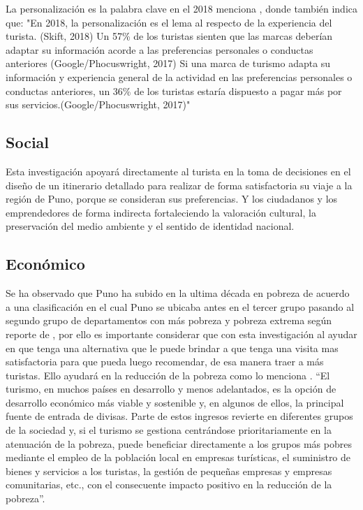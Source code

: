 La personalización es la palabra clave en el 2018 menciona  , donde también indica que:
"En 2018, la personalización es el lema al respecto de la experiencia del turista. (Skift, 2018)
Un 57\% de los turistas sienten que las marcas deberían adaptar su información acorde a las preferencias personales o conductas anteriores (Google/Phocuswright, 2017)
Si una marca de turismo adapta su información y experiencia general de la actividad en las preferencias personales o conductas anteriores, un 36\% de los turistas estaría dispuesto a pagar más por sus servicios.(Google/Phocuswright, 2017)"
\subsection{Social}
Esta investigación apoyará directamente al turista en la toma de decisiones en el diseño de un itinerario detallado para realizar de forma satisfactoria su viaje a la región de Puno, porque se consideran sus preferencias. Y los ciudadanos y los emprendedores de forma indirecta fortaleciendo la valoración cultural, la preservación del medio ambiente y el sentido de identidad nacional. 
\subsection{Económico}

Se ha observado que Puno ha subido en la ultima década en pobreza de acuerdo a una clasificación en el cual Puno se ubicaba antes en el tercer grupo pasando al segundo grupo de departamentos con más pobreza y pobreza extrema según reporte de , por ello es importante considerar que con esta investigación al ayudar en que tenga una alternativa que le puede brindar a que tenga una visita mas satisfactoria para que pueda luego recomendar, de esa manera traer a más turistas. Ello ayudará en la reducción de la pobreza como lo menciona . “El turismo, en muchos países en desarrollo y menos adelantados, es la opción de desarrollo económico más viable y sostenible y, en algunos de ellos, la principal fuente de entrada de divisas. Parte de estos ingresos revierte en diferentes grupos de la sociedad y, si el turismo se gestiona centrándose prioritariamente en la atenuación de la pobreza, puede beneficiar directamente a los grupos más pobres mediante el empleo de la población local en empresas turísticas, el suministro de bienes y servicios a los turistas, la gestión de pequeñas empresas y empresas comunitarias, etc., con el consecuente impacto positivo en la reducción de la pobreza”. 
